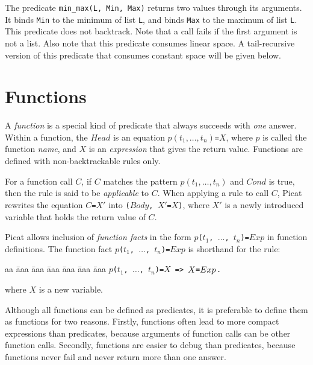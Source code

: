 The predicate \texttt{min\_max(L, Min, Max)} returns two values through its arguments.  It binds \texttt{Min} to the minimum of list \texttt{L}, and binds \texttt{Max} to the maximum of list \texttt{L}. This predicate does not backtrack. Note that a call fails if the first argument is not a list. Also note that this predicate consumes linear space. A tail-recursive version of this predicate that consumes constant space will be given below.


\section{Functions}
A \emph{function} is a special kind of predicate that always succeeds with \emph{one} answer. Within a function, the $Head$ is an equation $p(t_1, \ldots, t_n)$\verb+=+$X$, where $p$ is called the function \emph{name}, and $X$ is an \emph{expression} that gives the return value. Functions are defined with non-backtrackable rules only.  

For a function call $C$, if $C$ matches the pattern $p(t_1, \ldots, t_n)$ and $Cond$ is true, then the rule is said to be \emph{applicable} to $C$. When applying a rule to call $C$, Picat rewrites the equation $C$\verb+=+$X'$ into \texttt{($Body$, $X'$=$X$)}, where $X'$ is a newly introduced variable that holds the return value of $C$. 

Picat allows inclusion of \emph{function facts} in the form {\tt $p$($t_1$, $\ldots$, $t_n$)\verb+=+$Exp$} in function definitions. The function fact {\tt $p$($t_1$, $\ldots$, $t_n$)\verb+=+$Exp$} is shorthand for the rule:
\begin{tabbing}
aa \= aaa \= aaa \= aaa \= aaa \= aaa \= aaa \kill
\> {\tt $p$($t_1$, $\ldots$, $t_n$)\verb+=+$X$ \verb+=>+ $X\verb+=+Exp$.}
\end{tabbing}
where $X$ is a new variable.
 
Although all functions can be defined as predicates, it is preferable to define them as functions for two reasons.  Firstly, functions often lead to more compact expressions than predicates, because arguments of function calls can be other function calls.  Secondly, functions are easier to debug than predicates, because functions never fail and never return more than one answer. 

